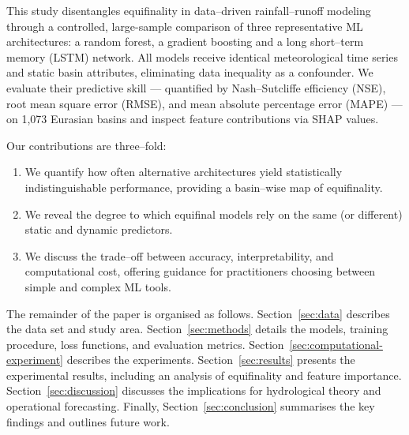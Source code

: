 This study disentangles equifinality in data--driven rainfall--runoff modeling through a controlled, large-sample comparison of three representative ML architectures: a random forest, a gradient boosting and a long short--term memory (LSTM) network. All models receive identical meteorological time series and static basin attributes, eliminating data inequality as a confounder. We evaluate their predictive skill --- quantified by Nash--Sutcliffe efficiency (NSE), root mean square error (RMSE), and mean absolute percentage error (MAPE) --- on 1,073 Eurasian basins and inspect feature contributions via SHAP values.

Our contributions are three--fold:
\begin{enumerate}
    \item We quantify how often alternative architectures yield statistically indistinguishable performance, providing a basin--wise map of equifinality.
    \item We reveal the degree to which equifinal models rely on the same (or different) static and dynamic predictors.
    \item We discuss the trade--off between accuracy, interpretability, and computational cost, offering guidance for practitioners choosing between simple and complex ML tools.
\end{enumerate}

The remainder of the paper is organised as follows. Section~\ref{sec:data} describes the data set and study area. Section~\ref{sec:methods} details the models, training procedure, loss functions, and evaluation metrics. Section~\ref{sec:computational-experiment} describes the experiments. Section~\ref{sec:results} presents the experimental results, including an analysis of equifinality and feature importance. Section~\ref{sec:discussion} discusses the implications for hydrological theory and operational forecasting. Finally, Section~\ref{sec:conclusion} summarises the key findings and outlines future work.

